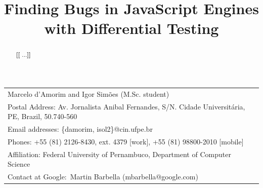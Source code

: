 \documentclass[11pt]{article}
\newcommand{\Fix}[1]{\textbf{[[}{\color{red} #1}\textbf{]]}}
\begin{document}
\title{Finding Bugs in JavaScript Engines with Differential Testing}
\author{}
\date{}


\makeatletter
\def\maketitle{%
  \par{\centering\large\textbf{\@title}\normalsize\par}\vspace{3ex}%
  \par{\@author}%
  \par}
\makeatother

\maketitle

\vspace{-2ex}
\small    
\begin{table}[h!] 
  \centering%
  \begin{tabular*}{.85\linewidth}{l}

    Marcelo d'Amorim and Igor Sim\~oes (M.Sc. student)\\
    
    Postal Address: Av. Jornalista Anibal Fernandes, S/N. Cidade
    Universit\'aria, PE, Brazil, 50.740-560 \\
    
    Email addresses: \{damorim, isol2\}@cin.ufpe.br\\

    Phones: +55 (81) 2126-8430,
    ext. 4379 [work], +55 (81) 98800-2010 [mobile]\\

    Affiliation: Federal University of Pernambuco, Department of
    Computer Science\\

    Contact at Google:~Martin Barbella (mbarbella@google.com)

  \end{tabular*}
\end{table}
\normalsize

\vspace{-2ex}
\begin{abstract}
  \Fix{...}
\end{abstract}
\end{document}
